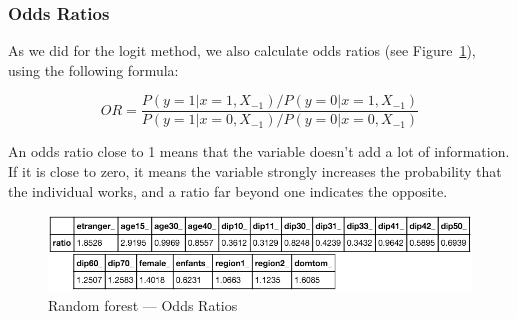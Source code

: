 
\subsubsection{Odds Ratios}
As we did for the logit method, we also calculate odds ratios (see Figure~\ref{fig:random_forest_odds_ratios}), using the following formula:

\begin{equation}
    OR = \frac{P(y=1|x=1, X_{-1})/P(y=0|x=1, X_{-1})}{P(y=1|x=0, X_{-1})/P(y=0|x=0, X_{-1})}
\end{equation}

An odds ratio close to 1 means that the variable doesn’t add a lot of information. If it is close to zero, it means the variable strongly increases the probability that the individual works, and a ratio far beyond one indicates the opposite.

\begin{figure}
    \centering
    \includegraphics[scale=0.25]{img/random_forest_odds_ratios.png}
    \caption{Random forest --- Odds Ratios}
    \label{fig:random_forest_odds_ratios}
\end{figure}

